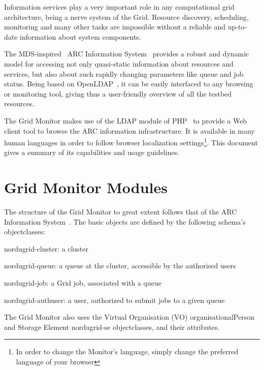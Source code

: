 \documentclass{article}
\begin{document}
Information services play a very important role in any computational
grid architecture, being a nerve system of the Grid. Resource
discovery, scheduling, monitoring and many other tasks are impossible
without a reliable and up-to-date information about system components.

The MDS-inspired~\cite{mds} ARC Information
System~\cite{is} provides a robust and dynamic model for accessing not
only quasi-static information about resources and services, but also
about such rapidly changing parameters like queue and job
status. Being based on OpenLDAP~\cite{ldap}, it can be easily
interfaced to any browsing or monitoring tool, giving thus a
user-friendly overview of all the testbed resources.

The Grid Monitor makes use of the LDAP module of PHP~\cite{php} to
provide a Web client tool to browse the ARC information infrastructure. It
is available in many human languages in order to follow browser
localization settings\footnote{In order to change the Monitor's language, simply
change the preferred language of your browser}. This
document gives a summary of its capabilities and usage guidelines.

\section{Grid Monitor Modules}
\label{sec:modules}

The structure of the Grid Monitor to great extent follows that of the
ARC Information System~\cite{is}. The basic objects are defined
by the following schema's objectclasses:
\begin{list}{--}{\itemsep=-0.5mm}
\item \textsf{nordugrid-cluster}: a cluster 
\item \textsf{nordugrid-queue}: a queue at the cluster, accessible by
  the authorised users 
\item \textsf{nordugrid-job}: a Grid job, associated with a queue
\item \textsf{nordugrid-authuser}: a user, authorized to submit jobs
  to a given queue 
\end{list}

The Grid Monitor also uses the Virtual Organisation (VO)
\textsf{organisationalPerson} and Storage Element
\textsf{nordugrid-se} objectclasses, and their attributes.
\end{document}
